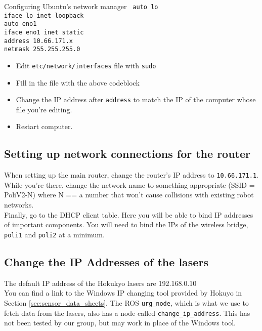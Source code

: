 \begin{example}{Configuring Ubuntu's network manager}\label{ex:network_manager}
	 \texttt{ auto lo \\
 iface lo inet loopback \\
 auto eno1 \\
 iface eno1 inet static \\
 address 10.66.171.x\\
 netmask 255.255.255.0}
   \begin{itemize}
     \item Edit \texttt{etc/network/interfaces} file with \texttt{sudo}
     \item Fill in the file with the above codeblock
     \item Change the IP address after \texttt{address} to match the IP of the computer whose file you're editing. 
     \item Restart computer.
   \end{itemize}
\end{example}

\subsection{Setting up network connections for the router}
When setting up the main router, change the router's IP address to \texttt{10.66.171.1}. \\

While you're there, change the network name to something appropriate (SSID = PoliV2-N) where N == a number that won't cause collisions with existing robot networks. \\

Finally, go to the DHCP client table. Here you will be able to bind IP addresses of important components. You will need to bind the IPs of the wireless bridge, \texttt{poli1} and \texttt{poli2} at a minimum. \\

\subsection{Change the IP Addresses of the lasers}
The default IP address of the Hokukyo lasers are 192.168.0.10 \\

You can find a link to the Windows IP changing tool provided by Hokuyo in Section \ref{sec:sensor_data_sheets}. 
The ROS \texttt{urg\_node}, which is what we use to fetch data from the lasers, also has a node called \texttt{change\_ip\_address}. 
This has not been tested by our group, but may work in place of the Windows tool. \\

